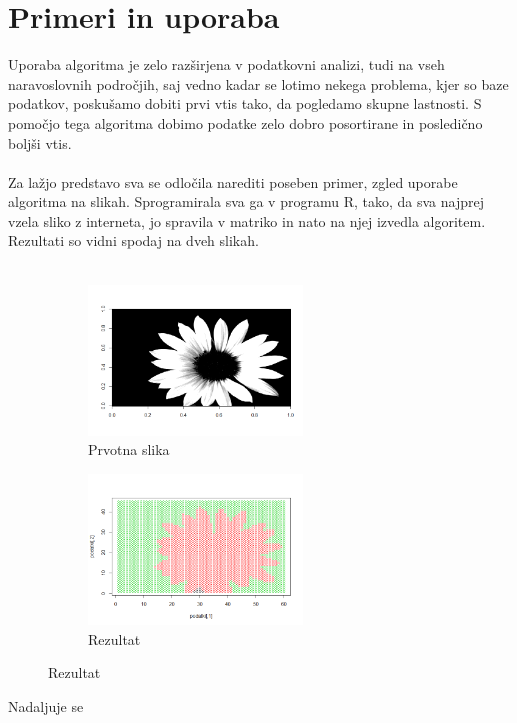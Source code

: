 \documentclass[a4paper, 10pt]{article}
\begin{document}
\section{Primeri in uporaba}

Uporaba algoritma je zelo razširjena v podatkovni analizi, tudi na vseh naravoslovnih področjih, saj vedno kadar se lotimo nekega problema, kjer so baze podatkov, poskušamo dobiti prvi vtis tako, da pogledamo skupne lastnosti. S pomočjo tega algoritma dobimo podatke zelo dobro posortirane in posledično boljši vtis.\\
\\
Za lažjo predstavo sva se odločila narediti poseben primer, zgled uporabe algoritma na slikah. Sprogramirala sva ga v programu R, tako, da sva najprej vzela sliko z interneta, jo spravila v matriko in nato na njej izvedla algoritem. Rezultati so vidni spodaj na dveh slikah.\\
\\
\begin{figure}[h]
 
\begin{subfigure}{0.5\textwidth}
\includegraphics[width=\linewidth, height=4cm]{prva} 
\caption{Prvotna slika}
\label{fig:subim1}
\end{subfigure}
\begin{subfigure}{0.5\textwidth}
\includegraphics[width=\linewidth, height=4cm]{druga}
\caption{Rezultat}
\label{fig:subim2}
\end{subfigure}
 
\end{figure}


Nadaljuje se
\end{document}
